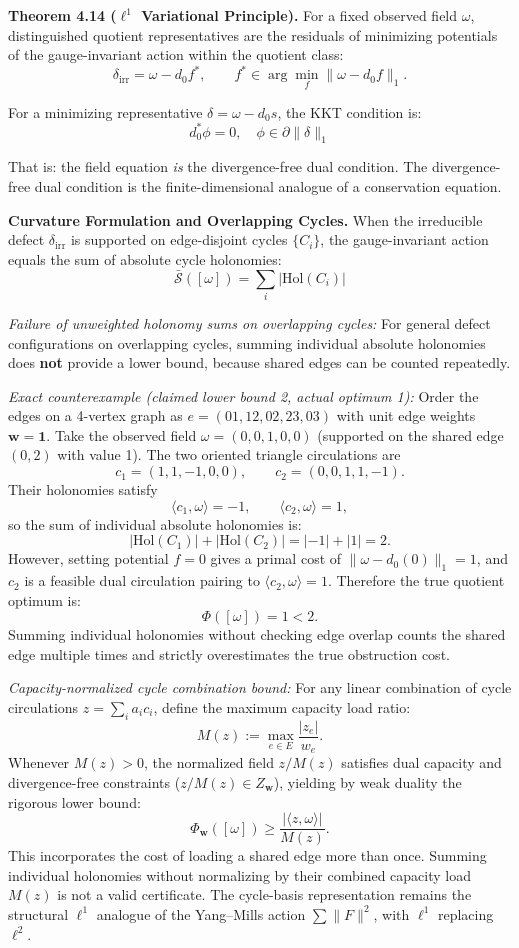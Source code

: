 \documentclass[
]{article}
\begin{document}
\textbf{Theorem 4.14 (\(\ell^1\) Variational Principle).} For a fixed observed field \(\omega\), distinguished quotient representatives are the residuals of minimizing potentials of the gauge-invariant action within the quotient class:
\[ \delta_{\mathrm{irr}} = \omega - d_0 f^*, \qquad f^* \in \arg\min_{f} \|\omega-d_0 f\|_1. \]

For a minimizing representative \(\delta=\omega-d_0s\), the KKT condition is:
\[ d_0^* \phi = 0, \quad \phi \in \partial \|\delta\|_1 \]

That is: the field equation \emph{is} the divergence-free dual condition. The divergence-free dual condition is the finite-dimensional analogue of a conservation equation.

\textbf{Curvature Formulation and Overlapping Cycles.} When the irreducible defect \(\delta_{\mathrm{irr}}\) is supported on edge-disjoint cycles \(\{C_i\}\), the gauge-invariant action equals the sum of absolute cycle holonomies:
\[ \bar{\mathcal{S}}([\omega]) = \sum_i |\mathrm{Hol}(C_i)| \]

\emph{Failure of unweighted holonomy sums on overlapping cycles:} For general defect configurations on overlapping cycles, summing individual absolute holonomies does \textbf{not} provide a lower bound, because shared edges can be counted repeatedly.

\emph{Exact counterexample (claimed lower bound 2, actual optimum 1):}
Order the edges on a 4-vertex graph as \(e = (01, 12, 02, 23, 03)\) with unit edge weights \(\mathbf{w}=\mathbf{1}\). Take the observed field \(\omega = (0, 0, 1, 0, 0)\) (supported on the shared edge \((0,2)\) with value 1). The two oriented triangle circulations are
\[c_1 = (1, 1, -1, 0, 0), \qquad c_2 = (0, 0, 1, 1, -1).\]
Their holonomies satisfy
\[\langle c_1, \omega \rangle = -1, \qquad \langle c_2, \omega \rangle = 1,\]
so the sum of individual absolute holonomies is:
\[|\mathrm{Hol}(C_1)| + |\mathrm{Hol}(C_2)| = |-1| + |1| = 2.\]
However, setting potential \(f = 0\) gives a primal cost of \(\|\omega - d_0(0)\|_1 = 1\), and \(c_2\) is a feasible dual circulation pairing to \(\langle c_2, \omega \rangle = 1\). Therefore the true quotient optimum is:
\[\Phi([\omega]) = 1 < 2.\]
Summing individual holonomies without checking edge overlap counts the shared edge multiple times and strictly overestimates the true obstruction cost.

\emph{Capacity-normalized cycle combination bound:}
For any linear combination of cycle circulations \(z = \sum_i a_i c_i\), define the maximum capacity load ratio:
\[M(z) := \max_{e \in E} \frac{|z_e|}{w_e}.\]
Whenever \(M(z) > 0\), the normalized field \(z / M(z)\) satisfies dual capacity and divergence-free constraints (\(z / M(z) \in Z_{\mathbf{w}}\)), yielding by weak duality the rigorous lower bound:
\[\Phi_{\mathbf{w}}([\omega]) \ge \frac{|\langle z, \omega \rangle|}{M(z)}.\]
This incorporates the cost of loading a shared edge more than once. Summing individual holonomies without normalizing by their combined capacity load \(M(z)\) is not a valid certificate. The cycle-basis representation remains the structural \(\ell^1\) analogue of the Yang--Mills action \(\sum \|F\|^2\), with \(\ell^1\) replacing \(\ell^2\).
\end{document}
